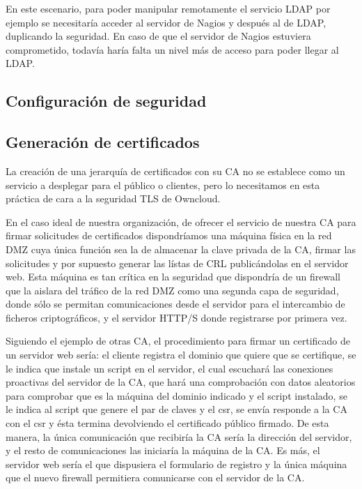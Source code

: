 \documentclass[]{article}
\begin{document}
En este escenario, para poder manipular remotamente el servicio LDAP por ejemplo se necesitaría acceder al servidor de Nagios y después al de LDAP, duplicando la seguridad. En caso de que el servidor de Nagios estuviera comprometido, todavía haría falta un nivel más de acceso para poder llegar al LDAP.




\subsection{Configuración de seguridad}

\subsection{Generación de certificados}

La creación de una jerarquía de certificados con su CA no se establece como un servicio a desplegar para el público o clientes, pero lo necesitamos en esta práctica de cara a la seguridad TLS de Owncloud.

En el caso ideal de nuestra organización, de ofrecer el servicio de nuestra CA para firmar solicitudes de certificados dispondríamos una máquina física en la red DMZ cuya única función sea la de almacenar la clave privada de la CA, firmar las solicitudes y por supuesto generar las lístas de CRL publicándolas en el servidor web. Esta máquina es tan crítica en la seguridad que dispondría de un firewall que la aislara del tráfico de la red DMZ como una segunda capa de seguridad, donde sólo se permitan comunicaciones desde el servidor para el intercambio de ficheros criptográficos, y el servidor HTTP/S donde registrarse por primera vez.

Siguiendo el ejemplo de otras CA, el procedimiento para firmar un certificado de un servidor web sería: el cliente registra el dominio que quiere que se certifique, se le indica que instale un script en el servidor, el cual escuchará las conexiones proactivas del servidor de la CA, que hará una comprobación con datos aleatorios para comprobar que es la máquina del dominio indicado y el script instalado, se le indica al script que genere el par de claves y el csr, se envía responde a la CA con el csr y ésta termina devolviendo el certificado público firmado. De esta manera, la única comunicación que recibiría la CA sería la dirección del servidor, y el resto de comunicaciones las iniciaría la máquina de la CA. Es más, el servidor web sería el que dispusiera el formulario de registro y la única máquina que el nuevo firewall permitiera comunicarse con el servidor de la CA.
\end{document}
